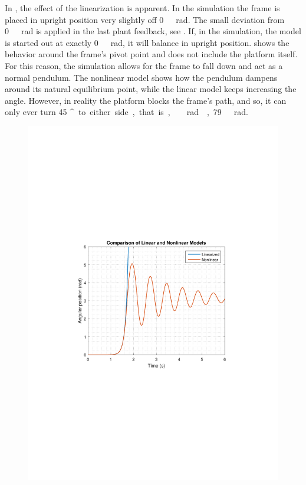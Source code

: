 In , the effect of the linearization is apparent. In the simulation the frame is placed in upright position very slightly off \si{0\ rad}. The small deviation from \si{0\ rad} is applied in the last plant feedback, see . If, in the simulation, the model is started out at exactly \si{0\ rad}, it will balance in upright position.
 shows the behavior around the frame's pivot point and does not include the platform itself. For this reason, the simulation allows for the frame to fall down and act as a normal pendulum. The nonlinear model shows how the pendulum dampens around its natural equilibrium point, while the linear model keeps increasing the angle.
However, in reality the platform blocks the frame's path, and so, it can only ever turn \si{45 ^\circ} to either side, that is, \si{\ rad ,79\ rad}.
%
\begin{minipage}{0.45\linewidth}
	\begin{figure}[H]
		\includegraphics[scale=.45]{figures/LinearizedVSNonlinear}
		\centering
		\vspace{-.4cm}
		\captionsetup{justification=centering}
		\label{LinearizedVSNonlinear}
	\end{figure}\vspace{-4mm}
\end{minipage}
